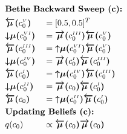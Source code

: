 \documentclass[fleqn]{article}
\begin{document}
\begin{minipage}[t]{0.5\textwidth}
    \begin{alignat}{2}
         & \rlap{\text{\bfseries Bethe Backward Sweep (c):}} \nonumber                                                                                                                                               \\
         & \bm{\overleftarrow{\mu}(}c^{\scriptscriptstyle V}_0\bm{)}           &  & = [0.5, 0.5]^T                                                                                                                   \\
         & \bm{{\downarrow}{\mu}(}c^{\scriptscriptstyle VI}_0\bm{)}            &  & = \bm{\overrightarrow{\mu}(}c^{\scriptscriptstyle III}_0\bm{)} \bm{\overleftarrow{\mu}(}c^{\scriptscriptstyle V}_0\bm{)}         \\
         & \bm{\overleftarrow{\mu}(}c^{\scriptscriptstyle III}_0\bm{)}         &  & = \bm{{\uparrow}{\mu}(}c^{\scriptscriptstyle VI}_0\bm{)} \bm{\overleftarrow{\mu}(}c^{\scriptscriptstyle V}_0\bm{)}               \\
         & \bm{{\downarrow}{\mu}(}c^{\scriptscriptstyle IV}_0\bm{)}            &  & = \bm{\overrightarrow{\mu}(}c^{\scriptscriptstyle I}_0\bm{)} \bm{\overleftarrow{\mu}(}c^{\scriptscriptstyle III}_0\bm{)}         \\
         & \bm{\overleftarrow{\mu}(}c^{\scriptscriptstyle I}_0\bm{)}           &  & = \bm{{\uparrow}{\mu}(}c^{\scriptscriptstyle IV}_0\bm{)} \bm{\overleftarrow{\mu}(}c^{\scriptscriptstyle III}_0\bm{)}             \\
         & \bm{{\downarrow}{\mu}(}c^{\scriptscriptstyle II}_0\bm{)}            &  & = \bm{\overrightarrow{\mu}(}c_0\bm{)} \bm{\overleftarrow{\mu}(}c^{\scriptscriptstyle I}_0\bm{)}                                  \\
         & \bm{\overleftarrow{\mu}(}c_0\bm{)}                                  &  & = \bm{{\uparrow}{\mu}(}c^{\scriptscriptstyle II}_0\bm{)} \bm{\overleftarrow{\mu}(}c^{\scriptscriptstyle I}_0\bm{)}               \\
         & \rlap{\text{\bfseries Updating Beliefs (c):}} \nonumber                                                                                                                                                   \\
         & q(c_0)                                                              &  & \propto \bm{\overleftarrow{\mu}(}c_0\bm{)} \bm{\overrightarrow{\mu}(}c_0\bm{)}                                                   \\

\end{alignat}
\end{minipage}
\end{document}
